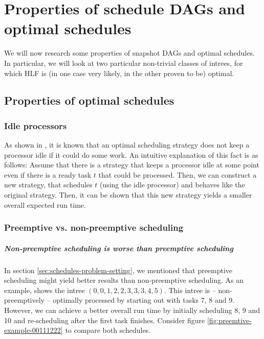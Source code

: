 \chapter{Properties of schedule DAGs and optimal schedules}
\label{chap:p3}

We will now research some properties of snapshot DAGs and optimal schedules. In particular, we will look at two particular non-trivial classes of intrees, for which HLF is (in one case very likely, in the other proven to be) optimal.

\section{Properties of optimal schedules}
\label{sec:optimal-schedules-properties}

\subsection{Idle processors}
\label{sec:optimal-schedule-no-idleness}

As shown in \cite{chandyreynoldslargepaper1979}, it is known that an optimal scheduling strategy does not keep a processor idle if it could do some work. An intuitive explanation of this fact is as follows: Assume that there is a strategy that keeps a processor idle at some point even if there is a ready task $t$ that could be processed. Then, we can construct a new strategy, that schedules $t$ (using the idle processor) and behaves like the original strategy. Then, it can be shown that this new strategy yields a smaller overall expected run time.

\subsection{Preemptive vs. non-preemptive scheduling}
\label{sec:optimal-schedules-preemtive}

\paragraph{Non-preemptive scheduling is worse than preemptive scheduling}

\label{preemtiveness-explanation}
In section \ref{sec:schedules-problem-setting}, we mentioned that preemptive scheduling might yield better results than non-preemptive scheduling. As an example, \cite{MoritzMaasDiploma} shows the intree $(0,0,1,2,2,3,3,3,4,5)$. This intree is -- non-preemptively -- optimally processed by starting out with tasks 7, 8 and 9. However, we can achieve a better overall run time by initially scheduling 8, 9 and 10 and re-scheduling after the first task finishes. Consider figure \ref{fig:preemtive-example-00111222} to compare both schedules.

